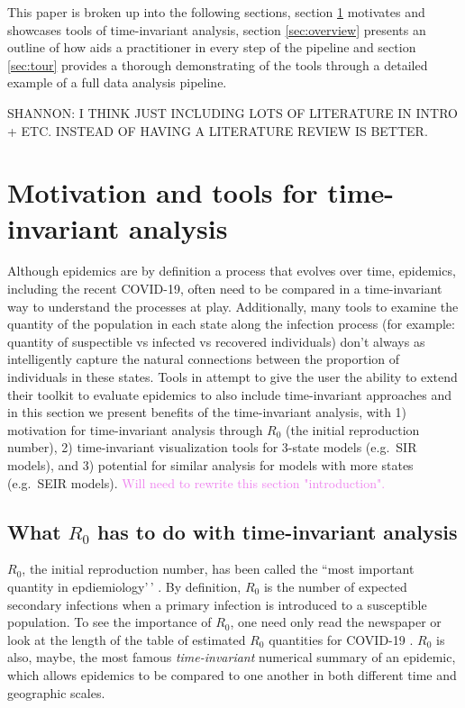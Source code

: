 \documentclass[
  shortnames]{jss}
\begin{document}
This paper is broken up into the following sections, section
\ref{sec:time-invariant} motivates and showcases tools of time-invariant
analysis, section \ref{sec:overview} presents an outline of how
 aids a practitioner in every step of the pipeline and
section \ref{sec:tour} provides a thorough demonstrating of the tools
through a detailed example of a full data analysis pipeline.

SHANNON: I THINK JUST INCLUDING LOTS OF LITERATURE IN INTRO + ETC.
INSTEAD OF HAVING A LITERATURE REVIEW IS BETTER.

\section[Time-invariant]{Motivation and tools for time-invariant
analysis}\label{sec:time-invariant}

Although epidemics are by definition a process that evolves over time,
epidemics, including the recent COVID-19, often need to be compared in a
time-invariant way to understand the processes at play. Additionally,
many tools to examine the quantity of the population in each state along
the infection process (for example: quantity of suspectible vs infected
vs recovered individuals) don't always as intelligently capture the
natural connections between the proportion of individuals in these
states. Tools in  attempt to give the user the ability
to extend their toolkit to evaluate epidemics to also include
time-invariant approaches and in this section we present benefits of the
time-invariant analysis, with 1) motivation for time-invariant analysis
through \(R_0\) (the initial reproduction number), 2) time-invariant
visualization tools for 3-state models (e.g.~SIR models), and 3)
potential for similar analysis for models with more states (e.g.~SEIR
models).
\textcolor{violet}{Will need to rewrite this section "introduction".}

\subsection[r0]{What \(R_0\) has to do with time-invariant
analysis}\label{r0}

\(R_0\), the initial reproduction number, has been called the ``most
important quantity in epdiemiology'\,' \citep[][]{heesterbeek2003}. By
definition, \(R_0\) is the number of expected secondary infections when
a primary infection is introduced to a susceptible population. To see
the importance of \(R_0\), one need only read the newspaper
\citep{Fisher2020} or look at the length of the table of estimated
\(R_0\) quantities for COVID-19 \citep{Aronson2020}. \(R_0\) is also,
maybe, the most famous \textit{time-invariant} numerical summary of an
epidemic, which allows epidemics to be compared to one another in both
different time and geographic scales.
\end{document}

